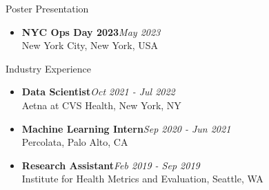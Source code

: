 \documentclass{resume} %
\begin{document}
\begin{rSection}{Poster Presentation}
\begin{itemize}
\item {\bf NYC Ops Day 2023}\hfill {\em May 2023}\\
New York City, New York, USA
\end{itemize}
\end{rSection}

\begin{rSection}{Industry Experience}
\begin{itemize}
\item {\bf Data Scientist}\hfill {\em Oct 2021 - Jul 2022}\\
Aetna at CVS Health, New York, NY
\item {\bf Machine Learning Intern}\hfill {\em Sep 2020 - Jun 2021}\\
Percolata, Palo Alto, CA
\item {\bf Research Assistant}\hfill {\em Feb 2019 - Sep 2019}\\
Institute for Health Metrics and Evaluation, Seattle, WA
\end{itemize}
\end{rSection}
\end{document}
